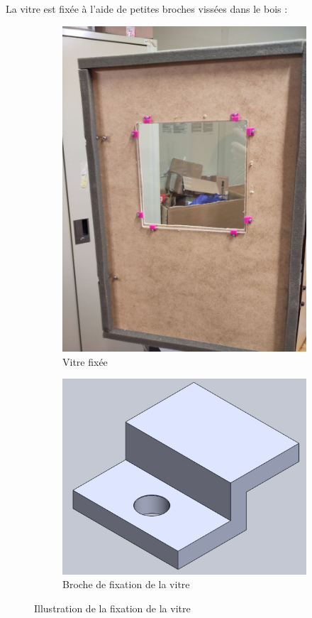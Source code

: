 La vitre est fixée à l'aide de petites broches vissées dans le bois :
\begin{figure}[H]
    \centering
    \begin{subfigure}{.5\textwidth}
        \centering
        \includegraphics[width=1\linewidth,trim = 250 420 180 300, clip]{assets/figures/ameliorations/fixation_vitre.jpg}
        \caption{Vitre fixée}
        \label{fig:vitre_fixee}
    \end{subfigure}%
    \begin{subfigure}{.5\textwidth}
        \centering
        \includegraphics[width=.75\linewidth]{assets/figures/ameliorations/broche_vitre.png}
        \caption{Broche de fixation de la vitre}
        \label{fig:broche_fixation_vitre}
    \end{subfigure}
    \caption[Illustration de la fixation de la vitre]{Illustration de la fixation de la vitre}
    \label{fig:illu_vitre_porte}
\end{figure}
